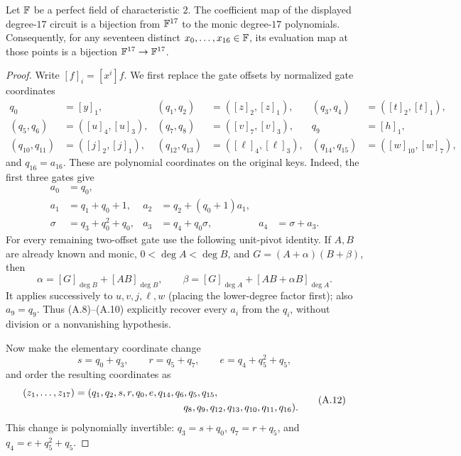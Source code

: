\begin{lemma}
\label{lem:char2-degree17-inverse}
Let $\mathbb{F}$ be a perfect field of characteristic $2$.  The coefficient map of
the displayed degree-$17$ circuit is a bijection from $\mathbb{F}^{17}$ to the monic
degree-$17$ polynomials.  Consequently, for any seventeen distinct
$x_0,\ldots,x_{16}\in\mathbb{F}$, its evaluation map at those points is a bijection
$\mathbb{F}^{17}\to\mathbb{F}^{17}$.
\end{lemma}
\begin{proof}
Write $[f]_i=[x^i]f$.  We first replace the gate offsets by normalized gate
coordinates
\[
\begin{aligned}
q_0&=[y]_1,
&(q_1,q_2)&=([z]_2,[z]_1),
&(q_3,q_4)&=([t]_2,[t]_1),\\
(q_5,q_6)&=([u]_4,[u]_3),
&(q_7,q_8)&=([v]_7,[v]_3),
&q_9&=[h]_1,\\
(q_{10},q_{11})&=([j]_2,[j]_1),
&(q_{12},q_{13})&=([\ell]_4,[\ell]_3),
&(q_{14},q_{15})&=([w]_{10},[w]_7),
\end{aligned}                                                     \tag{A.8}
\]
and $q_{16}=a_{16}$.  These are polynomial coordinates on the original
keys.  Indeed, the first three gates give
\[
\begin{aligned}
a_0&=q_0,\\
a_1&=q_1+q_0+1,
&a_2&=q_2+(q_0+1)a_1,\\
\sigma&=q_3+q_0^2+q_0,
&a_3&=q_4+q_0\sigma,
&a_4&=\sigma+a_3.
\end{aligned}                                                     \tag{A.9}
\]
For every remaining two-offset gate use the following unit-pivot identity.
If $A,B$ are already known and monic, $0<\deg A<\deg B$, and
$G=(A+\alpha)(B+\beta)$, then
\[
 \alpha=[G]_{\deg B}+[AB]_{\deg B},\qquad
 \beta=[G]_{\deg A}+[AB+\alpha B]_{\deg A}.                     \tag{A.10}
\]
It applies successively to $u,v,j,\ell,w$ (placing the lower-degree factor
first); also $a_9=q_9$.  Thus (A.8)--(A.10) explicitly recover every
$a_i$ from the $q_i$, without division or a nonvanishing hypothesis.

Now make the elementary coordinate change
\[
 s=q_0+q_3,\qquad r=q_5+q_7,\qquad e=q_4+q_5^2+q_5,               \tag{A.11}
\]
and order the resulting coordinates as
\[
\begin{aligned}
(z_1,\ldots,z_{17})={}&
(q_1,q_2,s,r,q_0,e,q_{14},q_6,q_5,q_{15},\\
&\hspace{34mm}q_8,q_9,q_{12},q_{13},q_{10},q_{11},q_{16}).
\end{aligned}                                                     \tag{A.12}
\]
This change is polynomially invertible:
$q_3=s+q_0$, $q_7=r+q_5$, and $q_4=e+q_5^2+q_5$.


\end{proof}
